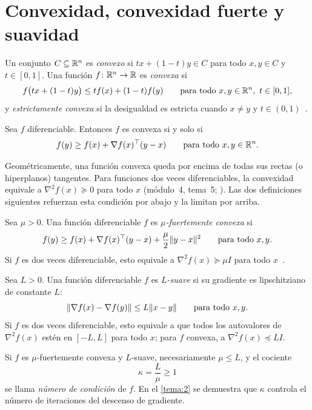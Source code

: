 \section{Convexidad, convexidad fuerte y suavidad}

\begin{definicion}
Un conjunto $C\subseteq\mathbb{R}^{n}$ es \emph{convexo} si $t x+(1-t)y\in C$ para todo $x,y\in C$ y $t\in[0,1]$. Una función $f\colon\mathbb{R}^{n}\to\mathbb{R}$ es \emph{convexa} si
\[
f\bigl(tx+(1-t)y\bigr)\le t f(x)+(1-t)f(y)\qquad\text{para todo } x,y\in\mathbb{R}^{n},\ t\in[0,1],
\]
y \emph{estrictamente convexa} si la desigualdad es estricta cuando $x\ne y$ y $t\in(0,1)$~\cite[cap.~2 y §3.1]{bv}.
\end{definicion}

\begin{teorema}\label{teo:primer-orden}
Sea $f$ diferenciable. Entonces $f$ es convexa si y solo si
\[
f(y)\ge f(x)+\nabla f(x)^{\top}(y-x)\qquad\text{para todo } x,y\in\mathbb{R}^{n}.
\]
\end{teorema}

Geométricamente, una función convexa queda por encima de todas sus rectas (o hiperplanos) tangentes. Para funciones dos veces diferenciables, la convexidad equivale a $\nabla^{2}f(x)\succeq 0$ para todo $x$ (módulo~4, tema~5; \cite[§3.1]{bv}). Las dos definiciones siguientes refuerzan esta condición por abajo y la limitan por arriba.

\begin{definicion}\label{def:fuerte}
Sea $\mu>0$. Una función diferenciable $f$ es \emph{$\mu$-fuertemente convexa} si
\[
f(y)\ge f(x)+\nabla f(x)^{\top}(y-x)+\frac{\mu}{2}\lVert y-x\rVert^{2}\qquad\text{para todo } x,y.
\]
Si $f$ es dos veces diferenciable, esto equivale a $\nabla^{2}f(x)\succeq\mu I$ para todo $x$~\cite[§9.1]{bv}.
\end{definicion}

\begin{definicion}\label{def:suave}
Sea $L>0$. Una función diferenciable $f$ es \emph{$L$-suave} si su gradiente es lipschitziano de constante $L$:
\[
\lVert\nabla f(x)-\nabla f(y)\rVert\le L\lVert x-y\rVert\qquad\text{para todo } x,y.
\]
Si $f$ es dos veces diferenciable, esto equivale a que todos los autovalores de $\nabla^{2}f(x)$ estén en $[-L,L]$ para todo $x$; para $f$ convexa, a $\nabla^{2}f(x)\preceq LI$.
\end{definicion}

Si $f$ es $\mu$-fuertemente convexa y $L$-suave, necesariamente $\mu\le L$, y el cociente
\[
\kappa=\frac{L}{\mu}\ge 1
\]
se llama \emph{número de condición} de $f$. En el \cref{tema:2} se demuestra que $\kappa$ controla el número de iteraciones del descenso de gradiente.

